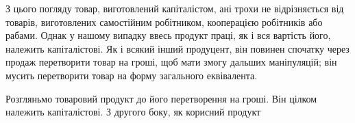 З цього погляду товар, виготовлений капіталістом, ані трохи не відрізняється
від товарів, виготовлених самостійним робітником, кооперацією
робітників або рабами. Однак у нашому випадку ввесь продукт праці,
як і вся вартість його, належить капіталістові. Як і всякий інший продуцент, він повинен спочатку
через продаж перетворити товар на гроші, щоб
мати змогу дальших маніпуляцій; він мусить перетворити товар на форму
загального еквівалента.

Розгляньмо товаровий продукт до його перетворення на гроші. Він
цілком належить капіталістові. З другого боку, як корисний продукт
\parbreak{}  %
